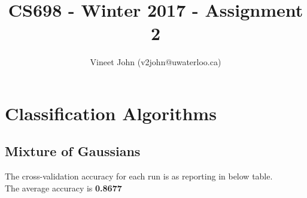 \documentclass[a4paper]{article}
\title{CS698 - Winter 2017 - Assignment 2}
\author{Vineet John (v2john@uwaterloo.ca)}
\date{}
\begin{document}
\maketitle

\renewcommand\thesubsection{\alph{subsection}}

\section{Classification Algorithms}

\subsection{Mixture of Gaussians}
The cross-validation accuracy for each run is as reporting in below table.\\
The average accuracy is \textbf{0.8677}
\end{document}

